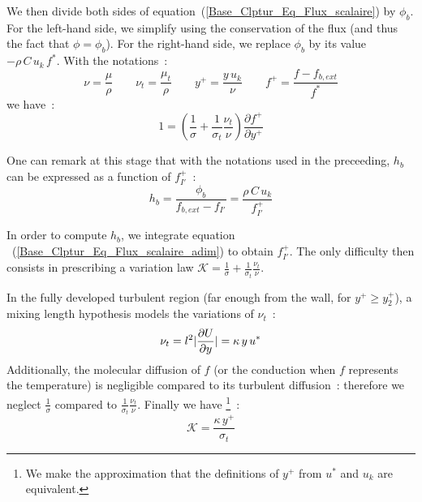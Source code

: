 We then divide both sides of equation~(\ref{Base_Clptur_Eq_Flux_scalaire})
by  $\phi_b$. For the left-hand side, we simplify using the conservation 
of the flux (and thus the fact that $\phi=\phi_b$). For the right-hand 
side, we replace $\phi_b$ by its value $-\rho\,C\,u_k\,f^*$.
With the notations~:
\begin{equation}
       \nu=\displaystyle\frac{\mu}{\rho}
\qquad \nu_t=\displaystyle\frac{\mu_t}{\rho}
\qquad y^+=\displaystyle\frac{y\,u_k}{\nu}
\qquad f^+=\displaystyle\frac{f-f_{b,ext}}{f^*}
\end{equation}
we have~:
\begin{equation}\label{Base_Clptur_Eq_Flux_scalaire_adim}
1 =  \left(\displaystyle\frac{1}{\sigma}+
              \displaystyle\frac{1}{\sigma_t}\frac{\nu_t}{\nu}\right)
                  \displaystyle\frac{\partial f^+}{\partial y^+}
\end{equation}

One can remark at this stage that with the notations used in the 
preceeding,  $h_b$ can be expressed as a function of $f^+_{I'}$~:
\begin{equation}
h_b=\displaystyle\frac{\phi_b}{f_{b,ext}-f_{I'}}=\frac{\rho\,C\,u_k}{f^+_{I'}}
\end{equation}

In order to compute $h_b$, we integrate 
equation ~(\ref{Base_Clptur_Eq_Flux_scalaire_adim}) to obtain 
$f^+_{I'}$. 
The only difficulty then consists in prescribing a variation law  
$\mathcal{K}=\displaystyle\frac{1}{\sigma}+
              \displaystyle\frac{1}{\sigma_t}\frac{\nu_t}{\nu}$.


In the fully developed turbulent region 
(far enough from the wall, for $y^+\geqslant y^+_2$),
a mixing length hypothesis models the variations of 
$\nu_t$~:
\begin{equation}
\nu_t = l^2 \arrowvert \frac{\partial U}{\partial y} \arrowvert =
\kappa \,y\,u^*
\end{equation}
Additionally, the molecular diffusion of $f$
(or the conduction when $f$ represents the temperature)
is negligible compared to its turbulent diffusion~: therefore 
we neglect 
$\displaystyle\frac{1}{\sigma}$ compared to  
$\displaystyle\frac{1}{\sigma_t}\frac{\nu_t}{\nu}$. 
Finally we have 
\footnote{We make the approximation that the definitions of $y^+$
from $u^*$ and $u_k$ are equivalent.}~:
\begin{equation}
\mathcal{K}= \displaystyle\frac{\kappa \,y^+}{\sigma_t}
\end{equation}

